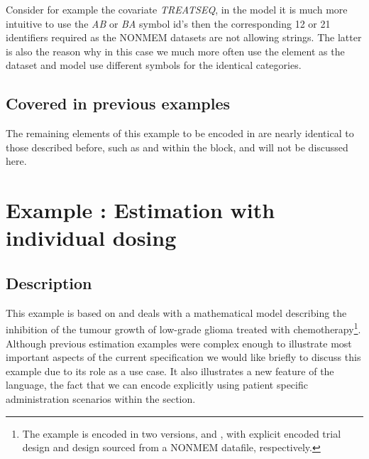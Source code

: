 Consider for example the covariate \emph{TREATSEQ}, in the model it is 
much more intuitive to use the \emph{AB} or \emph{BA} symbol id's then 
the corresponding 12 or 21 identifiers required as the NONMEM datasets 
are not allowing strings. The latter is also the reason why in this case we much
more often use the  element as the dataset and model
use different symbols for the identical categories.

\subsection{Covered in previous examples}
The remaining elements of this example to be encoded in \pharmml
are nearly identical to those described before, such as 
and  within the  block,
and will not be discussed here.

\section{Example \theexamples: Estimation with individual dosing}
\label{sec:Ribba}

\subsection{Description}
This example is based on \cite{Ribba:2012uq} and deals with a mathematical
model describing the inhibition of the tumour growth of low-grade glioma treated
with chemotherapy\footnote{The example is encoded in two versions,  
 and , with explicit encoded trial 
design and design sourced from a NONMEM datafile, respectively.}. 
Although previous estimation examples were complex
enough to illustrate most important aspects of the current \pharmml specification 
we would like briefly to discuss this example due to its role as a use case. It also 
illustrates a new feature of the language, the fact that we can encode explicitly 
using patient specific administration scenarios within the  section.

